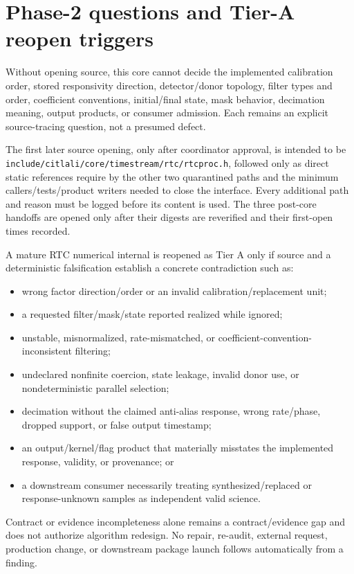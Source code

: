 \documentclass[11pt]{article}
\newcommand{\code}[1]{\nolinkurl{#1}}
\begin{document}
\section{Phase-2 questions and Tier-A reopen triggers}

Without opening source, this core cannot decide the implemented calibration
order, stored responsivity direction, detector/donor topology, filter types
and order, coefficient conventions, initial/final state, mask behavior,
decimation meaning, output products, or consumer admission.  Each remains an
explicit source-tracing question, not a presumed defect.

The first later source opening, only after coordinator approval, is intended
to be \code{include/citlali/core/timestream/rtc/rtcproc.h}, followed only as
direct static references require by the other two quarantined paths and the
minimum callers/tests/product writers needed to close the interface.  Every
additional path and reason must be logged before its content is used.  The
three post-core handoffs are opened only after their digests are reverified and
their first-open times recorded.

A mature RTC numerical internal is reopened as Tier A only if source and a
deterministic falsification establish a concrete contradiction such as:

\begin{itemize}
\item wrong factor direction/order or an invalid calibration/replacement unit;
\item a requested filter/mask/state reported realized while ignored;
\item unstable, misnormalized, rate-mismatched, or coefficient-convention-
      inconsistent filtering;
\item undeclared nonfinite coercion, state leakage, invalid donor use, or
      nondeterministic parallel selection;
\item decimation without the claimed anti-alias response, wrong rate/phase,
      dropped support, or false output timestamp;
\item an output/kernel/flag product that materially misstates the implemented
      response, validity, or provenance; or
\item a downstream consumer necessarily treating synthesized/replaced or
      response-unknown samples as independent valid science.
\end{itemize}

Contract or evidence incompleteness alone remains a contract/evidence gap and
does not authorize algorithm redesign.  No repair, re-audit, external request,
production change, or downstream package launch follows automatically from a
finding.
\end{document}
